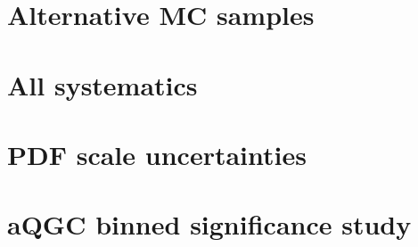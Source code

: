 
\clearpage
\section{Alternative MC samples}
\label{app:altsample}


\clearpage
\section{All systematics}
\label{app:allsyst}


\clearpage
\section{PDF scale uncertainties}
\label{app:pdfscale}


\clearpage
\section{aQGC binned significance study}
\label{app:binnedsig}

